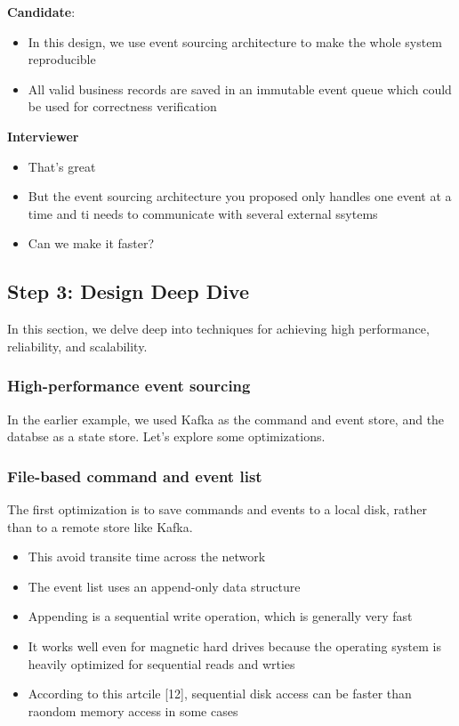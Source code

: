 \documentclass{report}
\theoremstyle{definition}
\let\oldsubsection\subsection
\let\oldsubsubsection\subsubsection
\renewcommand{\subsection}{\oldsubsection*}
\renewcommand{\subsubsection}{\oldsubsubsection*}
\begin{document}
\textbf{Candidate}:
\begin{itemize}
\item
In this design, we use event sourcing architecture to make the whole system reproducible
\item
All valid business records are saved in an immutable event queue which could be used for correctness verification
\end{itemize}

\textbf{Interviewer}

\begin{itemize}
\item
That's great
\item
But the event sourcing architecture you proposed only handles one event at a time and ti needs to communicate with several external ssytems
\item
Can we make it faster?
\end{itemize}

\subsection{Step 3: Design Deep Dive}

In this section, we delve deep into techniques for achieving high performance, reliability, and scalability.

\subsubsection{High-performance event sourcing}

In the earlier example, we used Kafka as the command and event store, and the databse as a state store. Let's explore some optimizations.

\subsubsection{File-based command and event list}

The first optimization is to save commands and events to a local disk, rather than to a remote store like Kafka.

\begin{itemize}
\item
This avoid transite time across the network
\item
The event list uses an append-only data structure
\item
Appending is a sequential write operation, which is generally very fast
\item
It works well even for magnetic hard drives because the operating system is heavily optimized for sequential reads and wrties
\item
According to this artcile [12], sequential disk access can be faster than raondom memory access in some cases
\end{itemize}
\end{document}
